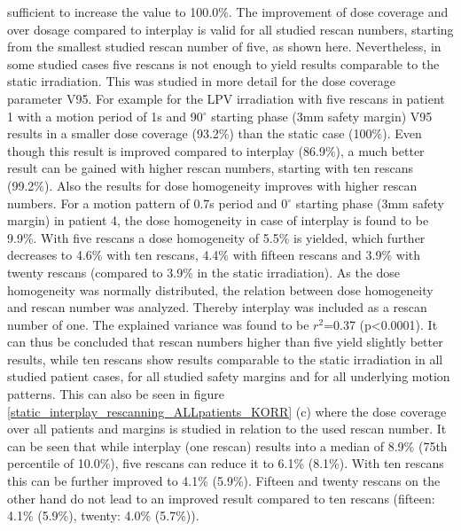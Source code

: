 sufficient to increase the value to 100.0\%. The improvement of dose coverage and over dosage 
compared to interplay is valid for all studied rescan numbers, starting from the smallest studied rescan number of five, as shown here. 
Nevertheless, in some studied cases five rescans is not enough to yield results comparable to the static irradiation. 
This was studied in more detail for the dose coverage parameter V95. 
For example for the LPV irradiation with five rescans in patient 1 with a motion period of 1s and 90$^{\circ}$ starting phase (3mm safety 
margin) V95 results in a smaller dose coverage (93.2\%) than the static case (100\%). Even though this result is improved compared to 
interplay (86.9\%), a much better result can be gained with higher rescan numbers, starting with ten rescans (99.2\%). Also the results for 
dose homogeneity improves with higher rescan numbers. For a motion pattern of 0.7s period and 0$^{\circ}$ starting phase (3mm safety margin) 
in patient 4, the dose homogeneity in case of interplay is found to be 9.9\%. With five rescans a dose homogeneity of 5.5\% is yielded, which 
further decreases to 4.6\% with ten rescans, 4.4\% with fifteen rescans and 3.9\% with twenty rescans (compared to 3.9\% in the static irradiation). 
As the dose homogeneity was normally distributed, the relation between dose homogeneity and rescan number was analyzed. 
Thereby interplay was included as a rescan number of one. The explained variance was found to be $r^{2}$=0.37 (p<0.0001). 
It can thus be concluded that rescan numbers higher than five yield slightly better results, while ten rescans show results comparable to the 
static irradiation in all studied patient cases, for all studied safety margins and for all underlying motion patterns. This can 
also be seen in figure \ref{static_interplay_rescanning_ALLpatients_KORR} (c) where the dose coverage over all patients and margins 
is studied in relation to the used rescan number. It can be seen that while interplay (one rescan) results into a median of 8.9\% 
(75th percentile of 10.0\%), five rescans can reduce it to 6.1\% (8.1\%). With ten rescans this can be further improved to 4.1\% (5.9\%). 
Fifteen and twenty rescans on the other hand do not lead to an improved result compared to ten rescans (fifteen: 4.1\% (5.9\%), 
twenty: 4.0\% (5.7\%)).

\vspace*{-0.2cm}


